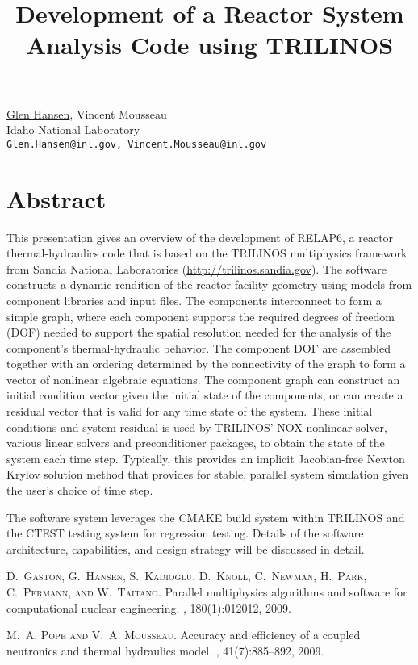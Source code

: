 \title{Development of a Reactor System Analysis Code using TRILINOS}
\author{} \institute{}
\maketitle

\begin{center}
{\large \underline{Glen Hansen}, Vincent Mousseau}\\
Idaho National Laboratory\\
{\tt Glen.Hansen@inl.gov, Vincent.Mousseau@inl.gov}
\end{center}

\section*{Abstract}
This presentation gives an overview of the development of RELAP6, a reactor thermal-hydraulics code that is based on the TRILINOS multiphysics framework from Sandia National Laboratories (\url{http://trilinos.sandia.gov}). The software constructs a dynamic rendition of the reactor facility geometry using models from component libraries and input files. The components interconnect to form a simple graph, where each component supports the required degrees of freedom (DOF) needed to support the spatial resolution needed for the analysis of the component's thermal-hydraulic behavior. The component DOF are assembled together with an ordering determined by the connectivity of the graph to form a vector of nonlinear algebraic equations.  The component graph can construct an initial condition vector given the initial state of the components, or can create a residual vector that is valid for any time state of the system. These initial conditions and system residual is used by TRILINOS' NOX nonlinear solver, various linear solvers and preconditioner packages, to obtain the state of the system each time step. Typically, this provides an implicit Jacobian-free Newton Krylov solution method that provides for stable, parallel system simulation given the user's choice of time step.

The software system leverages the CMAKE build system within TRILINOS and the CTEST testing system for regression testing. Details of the software architecture, capabilities, and design strategy will be discussed in detail.


\begin{thebibliography}{1}
\textsc{D.~Gaston, G.~Hansen, S.~Kadioglu, D.~Knoll, C.~Newman, H.~Park, C.~Permann, and W.~Taitano}.
\newblock Parallel multiphysics algorithms and software for computational nuclear engineering.
, 180(1):012012, 2009.

\textsc{M.~A. Pope and V.~A. Mousseau}.
\newblock Accuracy and efficiency of a coupled neutronics and thermal hydraulics model.
, 41(7):885--892, 2009.
\end{thebibliography}